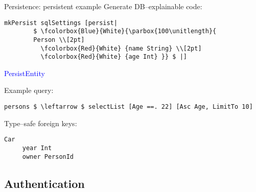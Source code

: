 \documentclass[10pt,usenames,dvipsnames]{beamer}
\begin{document}
	\begin{frame}[fragile]{Persistence: persistent example}
	\fboxsep=1pt
	\fboxrule=1pt
	Generate DB--explainable code:
\begin{minipage}[t]{0.6\textwidth}
		\begin{lstlisting}[mathescape=true]
		mkPersist sqlSettings [persist|
		$ \fcolorbox{Blue}{White}{\parbox{100\unitlength}{
		Person \\[2pt]
		  \fcolorbox{Red}{White} {name String} \\[2pt]
		  \fcolorbox{Red}{White} {age Int} }} $ |]
		\end{lstlisting}
\end{minipage}
\begin{minipage}[t]{0.3\textwidth}
\textcolor{Blue}{PersistEntity}
\end{minipage}
	Example query:
	\begin{lstlisting}[mathescape=true]
	persons $ \leftarrow $ selectList [Age ==. 22] [Asc Age, LimitTo 10]
	\end{lstlisting}
	Type--safe foreign keys:
	\begin{lstlisting}[mathescape=true]
	Car
	 year Int
	 owner PersonId
	\end{lstlisting}

	\end{frame}	
	
	\subsection*{Authentication}
	
\end{document}
